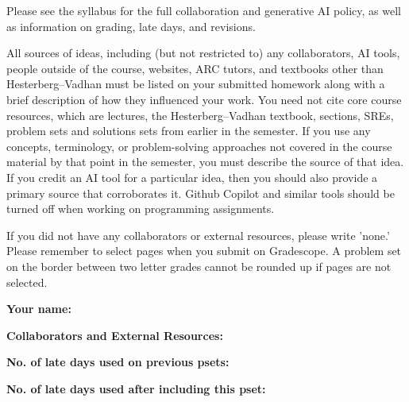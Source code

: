\documentclass[11pt]{article}
\begin{document}

Please see the syllabus for the full collaboration and generative AI policy, as well as information on grading, late days, and revisions.

All sources of ideas, including (but not restricted to) any collaborators, AI tools, people outside of the course, websites, ARC tutors, and textbooks other than Hesterberg--Vadhan must be listed on your submitted homework along with a brief description of how they influenced your work. You need not cite core course resources, which are lectures, the Hesterberg--Vadhan textbook, sections, SREs, problem sets and solutions sets from earlier in the semester. If you use any concepts, terminology, or problem-solving approaches not covered in the course material by that point in the semester, you must describe the source of that idea. If you credit an AI tool for a particular idea, then you should also provide a primary source that corroborates it. Github Copilot and similar tools should be turned off when working on programming assignments.

If you did not have any collaborators or external resources, please write 'none.' Please remember to select pages when you submit on Gradescope. A problem set on the border between two letter grades cannot be rounded up if pages are not selected. 

\vspace{1em}

\textbf{Your name: }

\textbf{Collaborators and External Resources:}

\textbf{No. of late days used on previous psets: }

\textbf{No. of late days used after including this pset: }
\end{document}
